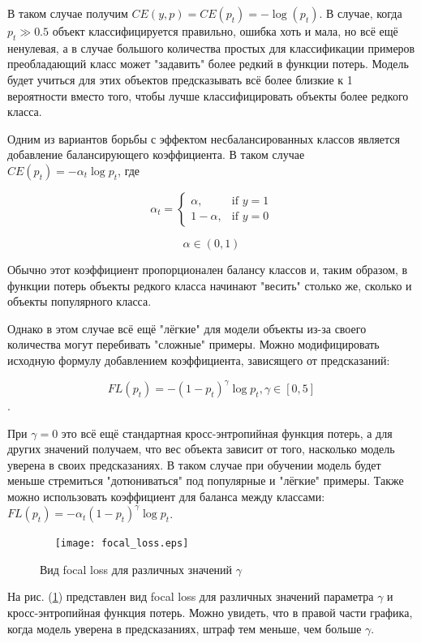 \documentclass[12pt,fleqn]{article}
\begin{document}
В таком случае получим $CE(y, p) = CE(p_t) = - \log (p_t)$. В случае, когда $p_t \gg 0.5$ объект классифицируется правильно, ошибка хоть и мала, но всё ещё ненулевая, а в случае большого количества простых для классификации примеров преобладающий класс может "задавить" более редкий в функции потерь. Модель будет учиться для этих объектов предсказывать всё более близкие к 1 вероятности вместо того, чтобы лучше классифицировать объекты более редкого класса.

Одним из вариантов борьбы с эффектом несбалансированных классов является добавление балансирующего коэффициента. В таком случае $CE(p_t) = - \alpha_t \log p_t$, где

$$
\alpha_t = \begin{cases} \alpha, & \mbox{if } y = 1 \\ 1 - \alpha, & \mbox{if } y = 0 \end{cases}
$$

$$\alpha \in (0, 1)$$

Обычно этот коэффициент пропорционален балансу классов и, таким образом, в функции потерь объекты редкого класса начинают "весить" столько же, сколько и объекты популярного класса.

Однако в этом случае всё ещё "лёгкие" для модели объекты из-за своего количества могут перебивать "сложные" примеры. Можно модифицировать исходную формулу добавлением коэффициента, зависящего от предсказаний:

$$FL(p_t) = - (1 - p_t)^\gamma \log p_t, \gamma \in [0, 5]$$.

При $\gamma = 0$ это всё ещё стандартная кросс-энтропийная функция потерь, а для других значений получаем, что вес объекта зависит от того, насколько модель уверена в своих предсказаниях. В таком случае при обучении модель будет меньше стремиться "дотюниваться" под популярные и "лёгкие" примеры. Также можно использовать коэффициент для баланса между классами: $FL(p_t) = - \alpha_t (1 - p_t)^\gamma \log p_t$.

\begin{center}
\begin{figure}[!htb]
 \centering
 \texttt{[image: focal\_loss.eps]}
 \caption{Вид focal loss для различных значений $\gamma$}\label{fig:plot}
\end{figure}
\end{center}

На рис. (\ref{fig:plot}) представлен вид focal loss для различных значений параметра $\gamma$ и кросс-энтропийная функция потерь. Можно увидеть, что в правой части графика, когда модель уверена в предсказаниях, штраф тем меньше, чем больше $\gamma$.
\end{document}
